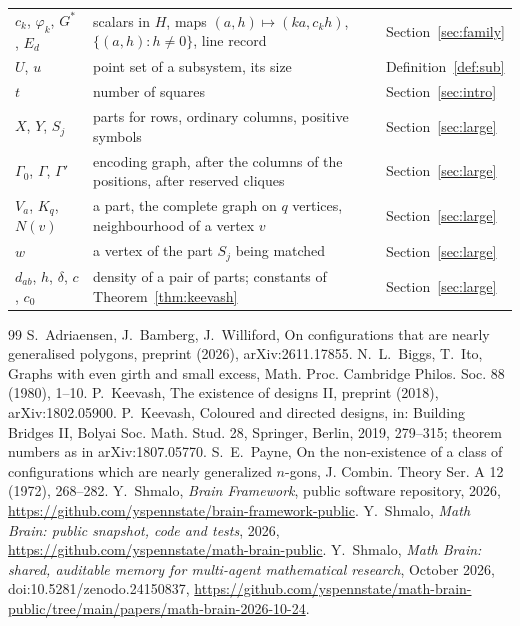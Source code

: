 \documentclass[11pt]{amsart}
\theoremstyle{definition}\newtheorem{definition}[theorem]{Definition}
\theoremstyle{remark}\newtheorem{remark}[theorem]{Remark}
\begin{document}
\begin{center}
\begin{tabular}{l p{6.4cm} p{2.6cm}}
$c_k$, $\varphi_k$, $G^*$, $E_d$ & scalars in $H$, maps $(a,h)\mapsto(ka,c_kh)$, $\{(a,h):h\ne0\}$, line record & Section~\ref{sec:family}\\
$U$, $u$ & point set of a subsystem, its size & Definition~\ref{def:sub}\\
$t$ & number of squares & Section~\ref{sec:intro}\\
$X$, $Y$, $S_j$ & parts for rows, ordinary columns, positive symbols & Section~\ref{sec:large}\\
$\Gamma_0$, $\Gamma$, $\Gamma'$ & encoding graph, after the columns of the positions, after reserved cliques & Section~\ref{sec:large}\\
$V_a$, $K_q$, $N(v)$ & a part, the complete graph on $q$ vertices, neighbourhood of a vertex $v$ & Section~\ref{sec:large}\\
$w$ & a vertex of the part $S_j$ being matched & Section~\ref{sec:large}\\
$d_{ab}$, $h$, $\delta$, $c$, $c_0$ & density of a pair of parts; constants of Theorem~\ref{thm:keevash} & Section~\ref{sec:large}\\
\bottomrule
\end{tabular}
\end{center}

\begin{thebibliography}{99}
 S.~Adriaensen, J.~Bamberg, J.~Williford, On configurations that are nearly generalised polygons, preprint (2026), arXiv:2611.17855.
 N.~L.~Biggs, T.~Ito, Graphs with even girth and small excess, Math. Proc. Cambridge Philos. Soc. 88 (1980), 1--10.
 P.~Keevash, The existence of designs II, preprint (2018), arXiv:1802.05900.
 P.~Keevash, Coloured and directed designs, in: Building Bridges II, Bolyai Soc. Math. Stud. 28, Springer, Berlin, 2019, 279--315; theorem numbers as in arXiv:1807.05770.
 S.~E.~Payne, On the non-existence of a class of configurations which are nearly generalized $n$-gons, J. Combin. Theory Ser. A 12 (1972), 268--282.
 Y.~Shmalo, \emph{Brain Framework}, public software repository, 2026, \url{https://github.com/yspennstate/brain-framework-public}.
 Y.~Shmalo, \emph{Math Brain: public snapshot, code and tests}, 2026, \url{https://github.com/yspennstate/math-brain-public}.
 Y.~Shmalo, \emph{Math Brain: shared, auditable memory for multi-agent mathematical research}, October 2026, doi:10.5281/zenodo.24150837, \url{https://github.com/yspennstate/math-brain-public/tree/main/papers/math-brain-2026-10-24}.
\end{thebibliography}
\end{document}
